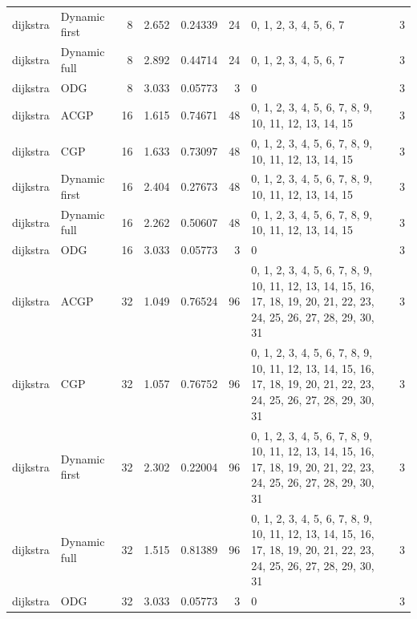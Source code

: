 \documentclass[10pt,a4paper]{article}
\begin{document}
\begin{longtable}{@{}p{23mm}p{29mm}rrrrp{36mm}r@{}}
dijkstra & Dynamic first & 8 & 2.652 & 0.24339 & 24 & 0, 1, 2, 3, 4, 5, 6, 7 & 3 \\
dijkstra & Dynamic full & 8 & 2.892 & 0.44714 & 24 & 0, 1, 2, 3, 4, 5, 6, 7 & 3 \\
dijkstra & ODG & 8 & 3.033 & 0.05773 & 3 & 0 & 3 \\
dijkstra & ACGP & 16 & 1.615 & 0.74671 & 48 & 0, 1, 2, 3, 4, 5, 6, 7, 8, 9, 10, 11, 12, 13, 14, 15 & 3 \\
dijkstra & CGP & 16 & 1.633 & 0.73097 & 48 & 0, 1, 2, 3, 4, 5, 6, 7, 8, 9, 10, 11, 12, 13, 14, 15 & 3 \\
dijkstra & Dynamic first & 16 & 2.404 & 0.27673 & 48 & 0, 1, 2, 3, 4, 5, 6, 7, 8, 9, 10, 11, 12, 13, 14, 15 & 3 \\
dijkstra & Dynamic full & 16 & 2.262 & 0.50607 & 48 & 0, 1, 2, 3, 4, 5, 6, 7, 8, 9, 10, 11, 12, 13, 14, 15 & 3 \\
dijkstra & ODG & 16 & 3.033 & 0.05773 & 3 & 0 & 3 \\
dijkstra & ACGP & 32 & 1.049 & 0.76524 & 96 & 0, 1, 2, 3, 4, 5, 6, 7, 8, 9, 10, 11, 12, 13, 14, 15, 16, 17, 18, 19, 20, 21, 22, 23, 24, 25, 26, 27, 28, 29, 30, 31 & 3 \\
dijkstra & CGP & 32 & 1.057 & 0.76752 & 96 & 0, 1, 2, 3, 4, 5, 6, 7, 8, 9, 10, 11, 12, 13, 14, 15, 16, 17, 18, 19, 20, 21, 22, 23, 24, 25, 26, 27, 28, 29, 30, 31 & 3 \\
dijkstra & Dynamic first & 32 & 2.302 & 0.22004 & 96 & 0, 1, 2, 3, 4, 5, 6, 7, 8, 9, 10, 11, 12, 13, 14, 15, 16, 17, 18, 19, 20, 21, 22, 23, 24, 25, 26, 27, 28, 29, 30, 31 & 3 \\
dijkstra & Dynamic full & 32 & 1.515 & 0.81389 & 96 & 0, 1, 2, 3, 4, 5, 6, 7, 8, 9, 10, 11, 12, 13, 14, 15, 16, 17, 18, 19, 20, 21, 22, 23, 24, 25, 26, 27, 28, 29, 30, 31 & 3 \\
dijkstra & ODG & 32 & 3.033 & 0.05773 & 3 & 0 & 3 \\
\end{longtable}\normalsize\setlength{\tabcolsep}{6pt}
\clearpage
\end{document}
